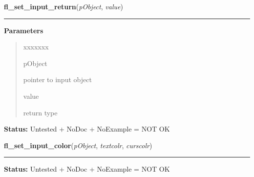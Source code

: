     \vspace{0.5ex}

\hspace{.8\funcindent}\begin{boxedminipage}{\funcwidth}

    \raggedright \textbf{fl\_set\_input\_return}(\textit{pObject}, \textit{value})

    \vspace{-1.5ex}

    \rule{\textwidth}{0.5\fboxrule}
\setlength{\parskip}{2ex}
\setlength{\parskip}{1ex}
      \textbf{Parameters}
      \vspace{-1ex}

      \begin{quote}
        \begin{Ventry}{xxxxxxx}

          \item[pObject]

          pointer to input object

          \item[value]

          return type

        \end{Ventry}

      \end{quote}

\textbf{Status:} Untested + NoDoc + NoExample = NOT OK



    \end{boxedminipage}

    \label{xformslib:library:fl_set_input_color}

    \vspace{0.5ex}

\hspace{.8\funcindent}\begin{boxedminipage}{\funcwidth}

    \raggedright \textbf{fl\_set\_input\_color}(\textit{pObject}, \textit{textcolr}, \textit{curscolr})

    \vspace{-1.5ex}

    \rule{\textwidth}{0.5\fboxrule}
\setlength{\parskip}{2ex}
\setlength{\parskip}{1ex}
\textbf{Status:} Untested + NoDoc + NoExample = NOT OK



    \end{boxedminipage}

